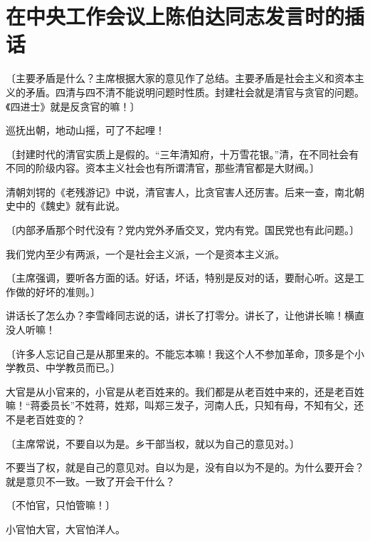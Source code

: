 \section[在中央工作会议上陈伯达同志发言时的插话（一九六四年十二月二十七日）]{在中央工作会议上陈伯达同志发言时的插话}


〔主要矛盾是什么？主席根据大家的意见作了总结。主要矛盾是社会主义和资本主义的矛盾。四清与四不清不能说明问题时性质。封建社会就是清官与贪官的问题。《四进士》就是反贪官的嘛！〕

巡抚出朝，地动山摇，可了不起哩！

〔封建时代的清官实质上是假的。“三年清知府，十万雪花银。”清，在不同社会有不同的阶级内容。资本主义社会也有所谓清官，那些清官都是大财阀。〕

清朝刘锷的《老残游记》中说，清官害人，比贪官害人还厉害。后来一查，南北朝史中的《魏史》就有此说。

〔内部矛盾那个时代没有？党内党外矛盾交叉，党内有党。国民党也有此问题。〕

我们党内至少有两派，一个是社会主义派，一个是资本主义派。

〔主席强调，要听各方面的话。好话，坏话，特别是反对的话，要耐心听。这是工作做的好坏的准则。〕

讲话长了怎么办？李雪峰同志说的话，讲长了打零分。讲长了，让他讲长嘛！横直没人听嘛！

〔许多人忘记自己是从那里来的。不能忘本嘛！我这个人不参加革命，顶多是个小学教员、中学教员而已。〕

大官是从小官来的，小官是从老百姓来的。我们都是从老百姓中来的，还是老百姓嘛！“蒋委员长”不姓蒋，姓郑，叫郑三发子，河南人氏，只知有母，不知有父，还不是老百姓变的？

〔主席常说，不要自以为是。乡干部当权，就以为自己的意见对。〕

不要当了权，就是自己的意见对。自以为是，没有自以为不是的。为什么要开会？就是意贝不一致。一致了开会干什么？

〔不怕官，只怕管嘛！〕

小官怕大官，大官怕洋人。



